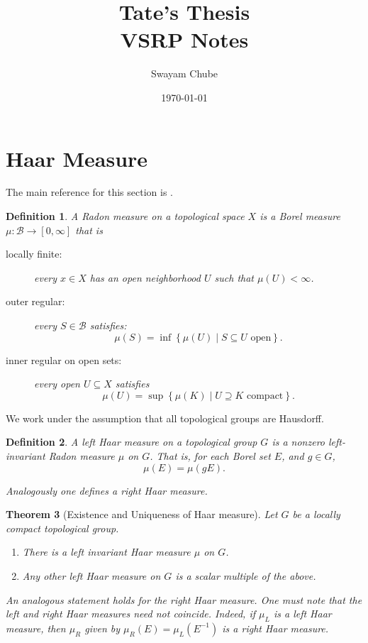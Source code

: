 \documentclass[12pt]{article}
\title{Tate's Thesis\\VSRP Notes}
\author{Swayam Chube}
\date{\today}
\theoremstyle{thmstyle}
\newtheorem{theorem}{Theorem}[section]
\theoremstyle{defstyle}
\newtheorem{definition}[theorem]{Definition}
\newcommand{\scrB}{\mathscr B}
\begin{document}
\maketitle

\section{Haar Measure}

The main reference for this section is \cite{deitmar}.

\begin{definition}
    A \emph{Radon measure} on a topological space $X$ is a Borel measure $\mu:\scrB\to [0,\infty]$ that is 
    \begin{description}
        \item[locally finite:] every $x\in X$ has an open neighborhood $U$ such that $\mu(U) < \infty$.
        \item[outer regular:] every $S\in\scrB$ satisfies: 
        \begin{equation*}
            \mu(S) = \inf\left\{\mu(U)\mid S\subseteq U\text{ open}\right\}.
        \end{equation*}
        \item[inner regular on open sets:] every open $U\subseteq X$ satisfies 
        \begin{equation*}
            \mu(U) = \sup\left\{\mu(K)\mid U\supseteq K\text{ compact}\right\}.
        \end{equation*}
    \end{description}
\end{definition}

We work under the assumption that all topological groups are Hausdorff.

\begin{definition}
    A \emph{left Haar measure} on a topological group $G$ is a nonzero left-invariant Radon measure $\mu$ on $G$. That is, for each Borel set $E$, and $g\in G$,
    \begin{equation*}
        \mu(E) = \mu(gE).
    \end{equation*}

    Analogously one defines a \emph{right Haar measure}. 
\end{definition}

\begin{theorem}[Existence and Uniqueness of Haar measure]
    Let $G$ be a locally compact topological group. 
    \begin{enumerate}[label=(\alph*)]
        \item There is a left invariant Haar measure $\mu$ on $G$.
        \item Any other left Haar measure on $G$ is a scalar multiple of the above.
    \end{enumerate}

    An analogous statement holds for the right Haar measure. One must note that the left and right Haar measures need not coincide. Indeed, if $\mu_L$ is a left Haar measure, then $\mu_R$ given by $\mu_R(E) = \mu_L(E^{-1})$ is a right Haar measure.
\end{theorem}
\end{document}
